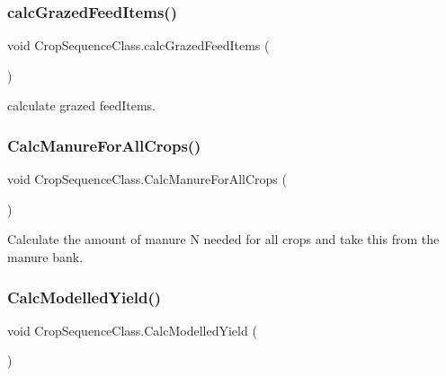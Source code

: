 \subsubsection{\texorpdfstring{calcGrazedFeedItems()}{calcGrazedFeedItems()}}
{\footnotesize\ttfamily void Crop\+Sequence\+Class.\+calc\+Grazed\+Feed\+Items (\begin{DoxyParamCaption}{ }\end{DoxyParamCaption})\hspace{0.3cm}{\ttfamily [inline]}}



calculate grazed feed\+Items. 

\mbox{\label{class_crop_sequence_class_a907b438fe2a9d3ada68b32472492f81d}} 
\subsubsection{\texorpdfstring{CalcManureForAllCrops()}{CalcManureForAllCrops()}}
{\footnotesize\ttfamily void Crop\+Sequence\+Class.\+Calc\+Manure\+For\+All\+Crops (\begin{DoxyParamCaption}{ }\end{DoxyParamCaption})\hspace{0.3cm}{\ttfamily [inline]}}



Calculate the amount of manure N needed for all crops and take this from the manure bank. 

\mbox{\label{class_crop_sequence_class_aeda543e18a2c235b31d36a41130f17e7}} 
\subsubsection{\texorpdfstring{CalcModelledYield()}{CalcModelledYield()}}
{\footnotesize\ttfamily void Crop\+Sequence\+Class.\+Calc\+Modelled\+Yield (\begin{DoxyParamCaption}{ }\end{DoxyParamCaption})\hspace{0.3cm}{\ttfamily [inline]}}



